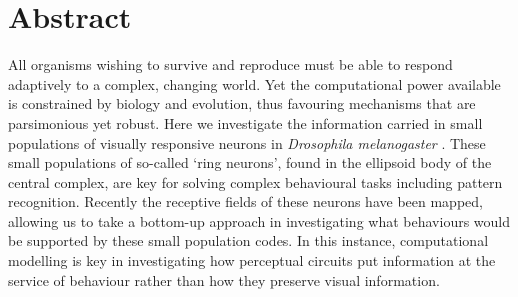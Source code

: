 \section*{Abstract}
All organisms wishing to survive and reproduce must be able to respond adaptively to a complex, changing world.
Yet the computational power available is constrained by biology and evolution, thus favouring mechanisms that are parsimonious yet robust.
Here we investigate the information carried in small populations of visually responsive neurons in \emph{Drosophila melanogaster} .
These small populations of so-called `ring neurons', found in the ellipsoid body of the central complex, are key for solving complex behavioural tasks including pattern recognition.
Recently the receptive fields of these neurons have been mapped, allowing us to take a bottom-up approach in investigating what behaviours would be supported by these small population codes.
In this instance, computational modelling is key in investigating how perceptual circuits put information at the service of behaviour rather than how they preserve visual information.